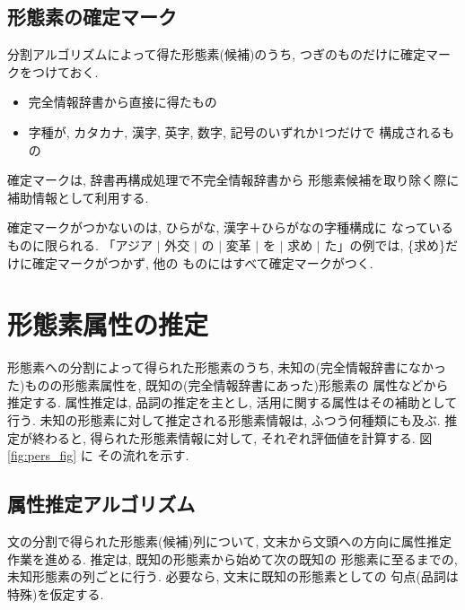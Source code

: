 \subsection{形態素の確定マーク}
分割アルゴリズムによって得た形態素(候補)のうち, 
つぎのものだけに確定マークをつけておく.  
\begin{itemize}
\item
完全情報辞書から直接に得たもの
\item
字種が, カタカナ, 漢字, 英字, 数字, 記号のいずれか1つだけで
構成されるもの
\end{itemize}
確定マークは, 辞書再構成処理で不完全情報辞書から
形態素候補を取り除く際に補助情報として利用する.  

確定マークがつかないのは, ひらがな, 漢字＋ひらがなの字種構成に
なっているものに限られる.  
「アジア $\mid$  外交 $\mid$  の $\mid$  変革 $\mid$  を $\mid$  
求め $\mid$  た」の例では, \{求め\}だけに確定マークがつかず, 他の
ものにはすべて確定マークがつく.  

\section{形態素属性の推定}
\label{grammar}
形態素への分割によって得られた形態素のうち, 
未知の(完全情報辞書になかった)ものの形態素属性を, 
既知の(完全情報辞書にあった)形態素の
属性などから推定する.  
属性推定は, 品詞の推定を主とし, 
活用に関する属性はその補助として行う.  
未知の形態素に対して推定される形態素情報は, 
ふつう何種類にも及ぶ.  
推定が終わると, 得られた形態素情報に対して, 
それぞれ評価値を計算する.  図\ref{fig:pers_fig} に
その流れを示す.  

\begin{figure*}[tb]
 \caption{形態素属性推定の流れ}
 \label{fig:pers_fig}
\end{figure*}
\subsection{ 属性推定アルゴリズム }
文の分割で得られた形態素(候補)列について, 
文末から文頭への方向に属性推定作業を進める.  
推定は, 既知の形態素から始めて次の既知の
形態素に至るまでの, 未知形態素の列ごとに行う.  
必要なら, 文末に既知の形態素としての
句点(品詞は特殊)を仮定する.  

